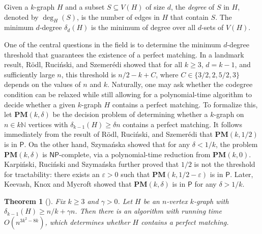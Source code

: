 \documentclass[11pt, letterpaper]{amsart}
\theoremstyle{plain}
\numberwithin{equation}{section}
\newtheorem{theorem}[thm]{Theorem}
\theoremstyle{definition}
\begin{document}
    Given a $k$-graph $H$ and a subset $S\subseteq V(H)$ of size $d$, the \emph{degree} of $S$ in $H$, denoted by $\deg_H(S)$, is the number of edges in $H$ that contain $S$. 
    The minimum $d$-degree $\delta_d(H)$ is the minimum of degree over all $d$-sets of $V(H)$.
    
    One of the central questions in the field is to determine the minimum $d$-degree threshold that guarantees the existence of a perfect matching.
    In a landmark result, R{\"{o}}dl, Ruci{\'{n}}ski, and Szemer{\'{e}}di \cite{rodl2009perfect} showed that for all $k\ge 3$, \(d=k-1\), and sufficiently large $n$, this threshold is $n/2-k+C$, where $C\in \{3/2,2,5/2,3\}$ depends on the values of $n$ and $k$.
    Naturally, one may ask whether the codegree condition can be relaxed while still allowing for a polynomial-time algorithm to decide whether a given $k$-graph $H$ contains a perfect matching.
    To formalize this, let \(\mathbf{PM}\left(k,\delta\right)\) be the decision problem of determining whether a \(k\)-graph on \(n\in k\mathbb{N}\) vertices with \(\delta_{k-1}(H)\ge \delta n\) contains a perfect matching. 
    It follows immediately from the result of R{\"{o}}dl, Ruci{\'{n}}ski, and Szemer{\'{e}}di \cite{rodl2009perfect} that \(\mathbf{PM}\left(k,1/2\right)\) is in \(\mathsf{P}\).
    On the other hand, Szyma\'{n}ska \cite{szymanska2013complexity} showed that for any \(\delta<1/k\), the problem \(\mathbf{PM}(k, \delta)\) is \(\mathsf{NP}\)-complete, via a polynomial-time reduction from $\mathbf{PM}(k,0)$.
    Karpi\'{n}ski, Ruci\'{n}ski and Szyma\'{n}ska \cite{karpinski2010computational} further proved that \(1/2\) is not the threshold for tractability: there exists an \(\varepsilon>0\) such that \(\mathbf{PM}\left(k,1/2-\varepsilon\right)\) is in \(\mathsf{P}\). 
    Later, Keevash, Knox and Mycroft \cite{keevash2013polynomial} showed that \(\mathbf{PM}\left(k,\delta\right)\) is in \(\mathsf{P}\) for any \(\delta>1/k\).

    \begin{theorem}[\cite{keevash2013polynomial}]\label{han-decision}
        Fix \(k\ge 3\) and \(\gamma>0\). Let $H$ be an $n$-vertex $k$-graph with $\delta_{k-1}(H)\ge n/k+\gamma n$. 
        Then there is an algorithm with running time $O(n^{{3k^2-8k}})$, which determines whether $H$ contains a perfect matching.
    \end{theorem}
\end{document}
